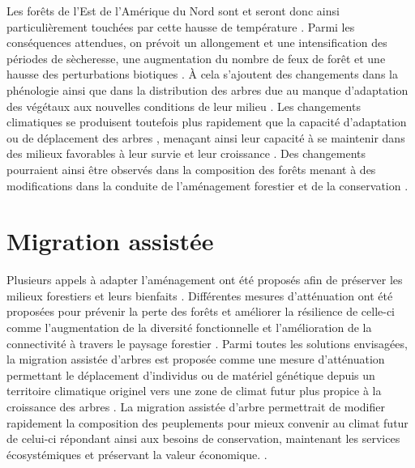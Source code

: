 Les forêts de l'Est de l'Amérique du Nord sont et seront donc ainsi particulièrement touchées par cette hausse de température \citep{Park2014Canboreal,Mahony2017closerlook,Messier2022Warningnatural,Sittaro2017Treerange}.
Parmi les conséquences attendues, on prévoit un allongement et une intensification des périodes de sècheresse, une augmentation du nombre de feux de forêt et une hausse des perturbations biotiques \citep{Gatti2021Amazoniacarbon,Heidari2021Effectsclimate,Joyce2013Climatechange,Parmesan2007Influencesspecies}. 
À cela s'ajoutent des changements dans la phénologie \citep{Chuine2010Whydoes} ainsi que dans la distribution des arbres \citep{Gray2013Trackingsuitable,Zhu2012Failuremigrate} due au manque d'adaptation des végétaux aux nouvelles conditions de leur milieu \citep{Aitken2008Adaptationmigration}.
Les changements climatiques se produisent toutefois plus rapidement que la capacité d'adaptation ou de déplacement des arbres \citep{Aitken2008Adaptationmigration,Harrison2020Plantcommunity,Loarie2009velocityclimate,Messier2022Warningnatural,Williams2013Preparingclimate,Vitt2010Assistedmigration}, 
menaçant ainsi leur capacité à se maintenir dans des milieux favorables à leur survie et leur croissance \citep{Sittaro2017Treerange,Woodall2018Decadalchanges,Zhu2012Failuremigrate}.
Des changements pourraient ainsi être observés dans la composition des forêts menant à des modifications dans la conduite de l'aménagement forestier et de la conservation \citep{Chmura2011Forestresponses,Lo2011Linkingclimate,McKenney2009Climatechange}.


\section*{Migration assistée}
\label{sec:fam}

Plusieurs appels à adapter l'aménagement ont été proposés afin de préserver les milieux forestiers et leurs bienfaits \citep{Messier2021sakeresilience,Nagel2017Adaptivesilviculture}.
Différentes mesures d'atténuation ont été proposées pour prévenir la perte des forêts et améliorer la résilience de celle-ci comme l'augmentation de la diversité fonctionnelle et l'amélioration de la connectivité à travers le paysage forestier \citep{Messier2019functionalcomplex}.
Parmi toutes les solutions envisagées, la migration assistée d'arbres est proposée comme une mesure d'atténuation permettant le déplacement d'individus ou de matériel génétique depuis un territoire climatique originel vers une zone de climat futur plus propice à la croissance des arbres \citep{Dumroese2015Considerationsrestoring,Palik2022Operationalizingforestassisted,Park2023Provenancetrials,Park2018Informationunderload,Pedlar2011implementationassisted,Vitt2010Assistedmigration,Williams2013Preparingclimate}. 
La migration assistée d'arbre permettrait de modifier rapidement la composition des peuplements pour mieux convenir au climat futur de celui-ci \citep{Pedlar2011implementationassisted} 
répondant ainsi aux besoins de conservation, maintenant les services écosystémiques et préservant la valeur économique. \citep{Ste-Marie2011Assistedmigration,Winder2011Ecologicalimplications}.


